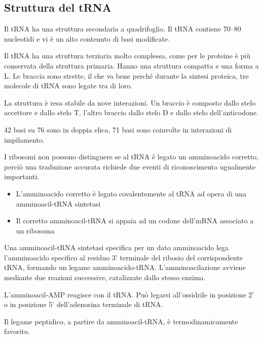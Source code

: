 \subsection{Struttura del tRNA}

Il tRNA ha una struttura secondaria a quadrifoglio. Il tRNA contiene 70--80 nucleotidi e vi è un alto contenuto di basi modificate.



Il tRNA ha una struttura terziaria molto complessa, come per le proteine è più conservata della struttura primaria. Hanno una struttura compatta e una forma a L. Le braccia sono strette, il che va bene perché durante la sintesi proteica, tre molecole di tRNA sono legate tra di loro.

La struttura è resa stabile da nove interazioni. Un braccio è composto dallo stelo accettore e dallo stelo T, l'altro braccio dallo stelo D e dallo stelo dell'anticodone.

42 basi su 76 sono in doppia elica, 71 basi sono coinvolte in interazioni di impilamento.

I ribosomi non possono distinguere se al tRNA è legato un amminoacido corretto, perciò una traduzione accurata richiede due eventi di riconoscimento ugualmente importanti.
\begin{itemize}
\item L'amminoacido corretto è legato covalentemente al tRNA ad opera di una amminoacil-tRNA sintetasi
\item Il corretto amminoacil-tRNA si appaia ad un codone dell'mRNA associato a un ribosoma
\end{itemize}

Una amminoacil-tRNA sintetasi specifica per un dato amminoacido lega l'amminoacido specifico al residuo 3' terminale del ribosio del corrispondente tRNA, formando un legame amminoacido-tRNA. L'amminoacilazione avviene mediante due reazioni successive, catalizzate dallo stesso enzima.

\vfill
\pagebreak


L'amminoacil-AMP reagisce con il tRNA. Può legarsi all'ossidrile in posizione 2' o in posizione 5' dell'adenosina terminale di tRNA.


Il legame peptidico, a partire da amminoacil-tRNA, è termodinamicamente favorito.

